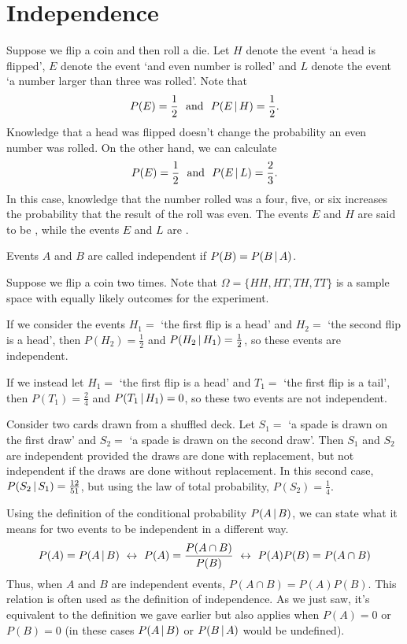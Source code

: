 \section{Independence}\label{IndependenceOfEvents}

Suppose we flip a coin and then roll a die. Let $H$ denote the event `a head is flipped', $E$ denote the event `and even number is rolled' and $L$ denote the event `a number larger than three was rolled'. Note that
$$P(E) = \frac{1}{2} \text{ \ and \ } P(E \,|\, H) = \frac{1}{2}.$$
Knowledge that a head was flipped doesn't change the probability an even number was rolled. On the other hand, we can calculate 
$$P(E) = \frac{1}{2} \text{ \ and \ } P(E \,|\, L) = \frac{2}{3}.$$
In this case, knowledge that the number rolled was a four, five, or six increases the probability that the result of the roll was even. The events $E$ and $H$ are said to be , while the events $E$ and $L$ are .
\begin{defn}\label{independentevents}
Events $A$ and $B$ are called independent if $P(B) = P(B \,|\, A)$.
\end{defn}
\begin{examp}Suppose we flip a coin two times. Note that $\Omega = \{HH, HT, TH, TT\}$ is a sample space with equally likely outcomes for the experiment.
\par
\noindent If we consider the events $H_1 =$ `the first flip is a head' and $H_2 =$ `the second flip is a head', then $P(H_2) = \frac{1}{2}$ and $P(H_2 \,|\, H_1) = \frac{1}{2}$, so these events are independent.
\par
\noindent If we instead let $H_1 =$ `the first flip is a head' and $T_1 =$ `the first flip is a tail', then $P(T_1) = \frac{2}{4}$ and $P(T_1 \,|\, H_1) = 0$, so these two events are not independent.
\end{examp}
\begin{examp}
Consider two cards drawn from a shuffled deck. Let $S_1 =$ `a spade is drawn on the first draw' and $S_2 =$ `a spade is drawn on the second draw'. Then $S_1$ and $S_2$ are independent provided the draws are done with replacement, but not independent if the draws are done without replacement. In this second case, $P(S_2 \,|\, S_1) = \frac{12}{51}$, but using the law of total probability, $P(S_2) = \frac{1}{4}$.
\end{examp}
\par
Using the definition of the conditional probability $P(A \,|\, B)$, we can state what it means for two events to be independent in a different way. 
$$P(A) = P(A \,|\, B) \ \leftrightarrow\  P(A) = \frac{P(A \cap B)}{P(B)} \ \leftrightarrow\  P(A)P(B) = P(A \cap B)$$
Thus, when $A$ and $B$ are independent events, $P(A \cap B) = P(A)P(B)$. This relation is often used as the definition of independence. As we just saw, it's equivalent to the definition we gave earlier but also applies when $P(A) = 0$ or $P(B) = 0$ (in these cases $P(A\,|\, B)$ or $P(B \,|\, A)$ would be undefined).

